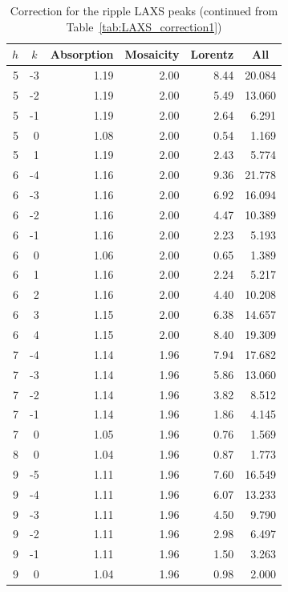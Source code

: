\begin{table}[htbp]
  \centering
    \begin{tabular}{rrrrrr}
    \hline
    \multicolumn{1}{c}{$h$} & \multicolumn{1}{c}{$k$} & \multicolumn{1}{c}{Absorption} & \multicolumn{1}{c}{Mosaicity} & \multicolumn{1}{c}{Lorentz} & \multicolumn{1}{c}{All}\\
    \hline        
    5  & -3 & 1.19 & 2.00 & 8.44 & 20.084 \\
    5  & -2 & 1.19 & 2.00 & 5.49 & 13.060 \\
    5  & -1 & 1.19 & 2.00 & 2.64 & 6.291  \\
    5  & 0  & 1.08 & 2.00 & 0.54 & 1.169  \\
    5  & 1  & 1.19 & 2.00 & 2.43 & 5.774  \\
    6  & -4 & 1.16 & 2.00 & 9.36 & 21.778 \\
    6  & -3 & 1.16 & 2.00 & 6.92 & 16.094 \\
    6  & -2 & 1.16 & 2.00 & 4.47 & 10.389 \\
    6  & -1 & 1.16 & 2.00 & 2.23 & 5.193  \\
    6  & 0  & 1.06 & 2.00 & 0.65 & 1.389  \\
    6  & 1  & 1.16 & 2.00 & 2.24 & 5.217  \\
    6  & 2  & 1.16 & 2.00 & 4.40 & 10.208 \\
    6  & 3  & 1.15 & 2.00 & 6.38 & 14.657 \\
    6  & 4  & 1.15 & 2.00 & 8.40 & 19.309 \\
    7  & -4 & 1.14 & 1.96 & 7.94 & 17.682 \\
    7  & -3 & 1.14 & 1.96 & 5.86 & 13.060 \\
    7  & -2 & 1.14 & 1.96 & 3.82 & 8.512  \\
    7  & -1 & 1.14 & 1.96 & 1.86 & 4.145  \\
    7  & 0  & 1.05 & 1.96 & 0.76 & 1.569  \\
    8  & 0  & 1.04 & 1.96 & 0.87 & 1.773  \\
    9  & -5 & 1.11 & 1.96 & 7.60 & 16.549 \\
    9  & -4 & 1.11 & 1.96 & 6.07 & 13.233 \\
    9  & -3 & 1.11 & 1.96 & 4.50 & 9.790  \\
    9  & -2 & 1.11 & 1.96 & 2.98 & 6.497  \\
    9  & -1 & 1.11 & 1.96 & 1.50 & 3.263  \\
    9  & 0  & 1.04 & 1.96 & 0.98 & 2.000  \\
    \hline
    \end{tabular}%
  \caption{Correction for the ripple LAXS peaks (continued from Table~\ref{tab:LAXS_correction1})}
  \label{tab:LAXS_correction2}%
\end{table}%


